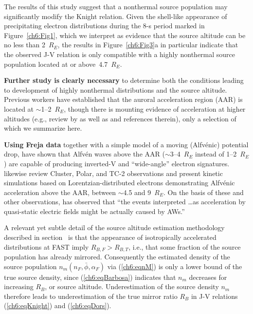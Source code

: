   The results of this study suggest that a nonthermal source population may
  significantly modify the Knight relation. Given the shell-like appearance of
  precipitating electron distributions during the 8-s period marked in
  Figure~\ref{ch6:Fig1}, which we interpret as evidence that the source altitude
  can be no less than 2~$R_E$, the results in Figure~\ref{ch6:Fig3}a in
  particular indicate that the observed J-V relation is only compatible with a
  highly nonthermal source population located at or above~4.7~$R_E$. 

  \textbf{Further study is clearly necessary} to determine both the conditions leading to
  development of highly nonthermal distributions and the source
  altitude. Previous workers have established that the auroral acceleration
  region (AAR) is located at $\sim$1--2~$R_E$, though there is mounting evidence
  of acceleration at higher altitudes (e.g., review by \citet{Mottez2016} as
  well as \citet{Watt2012} and references therein), only a selection of which we
  summarize here.

  \textbf{Using Freja data} together with a simple model of a moving (Alfv\'{e}nic)
  potential drop, \citet{Andersson2002a} have shown that Alfv\'{e}n waves above
  the AAR ($\sim$3--4~$R_E$ instead of 1--2~$R_E$) are capable of producing
  inverted-V and ``wide-angle'' electron signatures. \citet{Watt2012} likewise
  review Cluster, Polar, and TC-2 observations and present kinetic simulations
  based on Lorentzian-distributed electrons demonstrating Alfv\'{e}nic
  acceleration above the AAR, between $\sim$4.5 and 9~$R_E$. On the basis of
  these and other observations, \citet{Mottez2016} has observed that ``the
  events interpreted \dots as acceleration by quasi-static electric fields might
  be actually caused by AWs.''

  A relevant yet subtle detail of the source altitude estimation methodology
  described in section~\label{ssSourceAlt} is that the appearance of
  isotropically accelerated distributions at FAST imply $R_{B,F} > R_{B,T}$,
  i.e., that some fraction of the source population has already
  mirrored. Consequently the estimated density of the source population
  $n_m ( n_F, \bar{\phi}, \alpha_F )$ via (\ref{ch6:eqnM}) is only a lower bound
  of the true source density, since (\ref{ch6:eqBarbosa}) indicates that $n_m$
  decreases for increasing $R_B$, or source altitude. Underestimation of the
  source density $n_m$ therefore leads to underestimation of the true mirror
  ratio $R_B$ in J-V relations (\ref{ch6:eqKnight}) and (\ref{ch6:eqDors}).

